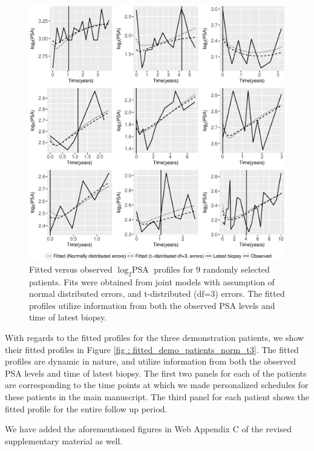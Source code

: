 \begin{enumerate}
    \begin{figure}[!htb]
    \centerline{\includegraphics[width=\columnwidth]{../images/model_fit/subject_fittedVsObserved_psa_norm_t3.eps}}
    \caption{Fitted versus observed $\log_2 \mbox{PSA}$ profiles for 9 randomly selected patients. Fits were obtained from joint models with assumption of normal distributed errors, and t-distributed (df=3) errors. The fitted profiles utilize information from both the observed PSA levels and time of latest biopsy.}
    \label{fig : subject_fittedVsObserved_psa_norm_t3_ref2}
    \end{figure}

    With regards to the fitted profiles for the three demonstration patients, we show their fitted profiles in Figure \ref{fig : fitted_demo_patients_norm_t3}. The fitted profiles are dynamic in nature, and utilize information from both the observed PSA levels and time of latest biopsy. The first two panels for each of the patients are corresponding to the time points at which we made personalized schedules for these patients in the main manuscript. The third panel for each patient shows the fitted profile for the entire follow up period.

    We have added the aforementioned figures in Web Appendix C of the revised supplementary material as well.
    

\end{enumerate}
